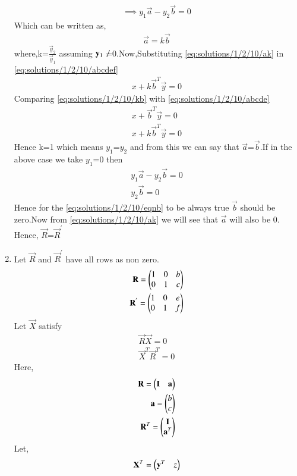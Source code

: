 \begin{enumerate}
\begin{align}
 \implies y_1 \vec{a}-y_2\vec{b} = 0
 \end{align}
 Which can be written as,
 \begin{align}
 \vec{a}=k\vec{b}\label{eq:solutions/1/2/10/ak}
\end{align}
where,k=$\frac{\vec{y}_2}{\vec{y}_1}$ assuming $\vec{y}_1 \not$=0.Now,Substituting \eqref{eq:solutions/1/2/10/ak} in \eqref{eq:solutions/1/2/10/abcdef}
\begin{align}
x+k\vec{b}^T\vec{y}=0\label{eq:solutions/1/2/10/kb}
\end{align}
Comparing \eqref{eq:solutions/1/2/10/kb} with \eqref{eq:solutions/1/2/10/abcde}
\begin{align}
x+\vec{b}^T\vec{y}=0\\
x+k\vec{b}^T\vec{y}=0
\end{align}
Hence k=1 which means $y_1$=$y_2$ and from this we can say that $\vec{a}$=$\vec{b}$.If in the above case we take $y_1$=0 then
\begin{align}
y_1\vec{a}-y_2\vec{b}=0\\
y_2\vec{b}=0\label{eq:solutions/1/2/10/eqnb}
\end{align}
Hence for the \eqref{eq:solutions/1/2/10/eqnb} to be always true $\vec{b}$ should be zero.Now from \eqref{eq:solutions/1/2/10/ak} we will see that  $\vec{a}$ will also be 0.
 Hence, $\vec{R}$=$\vec{R}^{\prime}$
 \item Let $\vec{R}$ and $\vec{R}^{'}$ have all rows as non zero.
\begin{align}\vec{R}=\myvec{1&0&b\\0&1&c} \\\vec{R}^{'}=\myvec{1&0&e\\0&1&f}\end{align}
 Let $\vec{X}$ satisfy
  \begin{align}
  \vec{R}\vec{X}=0\label{eq:solutions/1/2/10/e}\\
  \vec{X}^{T}\vec{R}^{T}=0\label{eq:solutions/1/2/10/fi}
  \end{align}
  Here,
  \begin{align}
  \vec{R}=\myvec{\vec{I}&\vec{a}}\label{eq:solutions/1/2/10/f}\\
  \vec{a}=\myvec{b \\c}\\
  \vec{R}^{T}=\myvec{\vec{I}\\\vec{a}^T}
  \end{align}
  Let,
  \begin{align}
  \vec{X}^T=\myvec{\vec{y}^T&z}\label{eq:solutions/1/2/10/g}

\end{align}
\end{enumerate}
